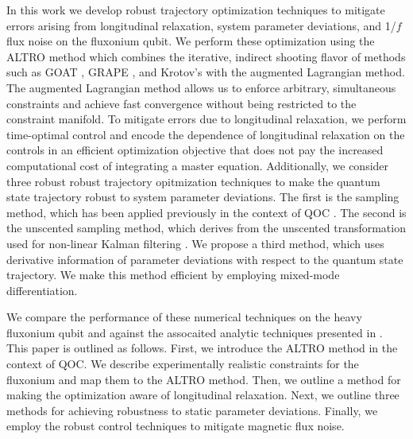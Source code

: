 In this work we develop robust trajectory optimization techniques to mitigate
errors arising from longitudinal relaxation, system parameter deviations, and 1/$f$ flux noise
on the fluxonium qubit. We perform these optimization using the ALTRO
method \cite{howell2019altro} which combines the iterative, indirect shooting
flavor of methods such as GOAT \cite{machnes2015gradient}, GRAPE
\cite{khaneja2005optimal, leung2017speedup}, and Krotov's \cite{goerz2019krotov}
with the augmented Lagrangian method. The augmented Lagrangian method
allows us to enforce arbitrary, simultaneous constraints and achieve
fast convergence without being restricted to the constraint
manifold. To mitigate errors due to longitudinal
relaxation, we perform time-optimal control and
encode the dependence of longitudinal relaxation
on the controls in an efficient optimization objective that does
not pay the increased computational cost of integrating a master equation.
Additionally, we consider three robust
robust trajectory opitmization techniques to make the
quantum state trajectory robust to system parameter deviations.
The first is the sampling method, which has been applied
previously in the context of QOC
\cite{carvalho2020error, reinhold2019controlling, rembold2020introduction}.
The second is the unscented sampling
method, which derives from the unscented transformation used
for non-linear Kalman filtering
\cite{julier2004unscented, lee2013sigma, manchester2016derivative}.
We propose a third method, which uses derivative information
of parameter deviations with respect to the quantum state trajectory.
We make this method efficient by employing mixed-mode differentiation.

We compare the performance of these numerical techniques
on the heavy fluxonium qubit and against the assocaited analytic techniques
presented in \cite{zhang2020universal}. This paper is outlined as follows.
First, we introduce the ALTRO method in the context of QOC.
We describe experimentally
realistic constraints for the fluxonium and
map them to the ALTRO method. Then, we
outline a method for making the optimization aware of longitudinal
relaxation. Next, we outline three methods for achieving
robustness to static parameter deviations. Finally,
we employ the robust control techniques to mitigate magnetic flux noise.
